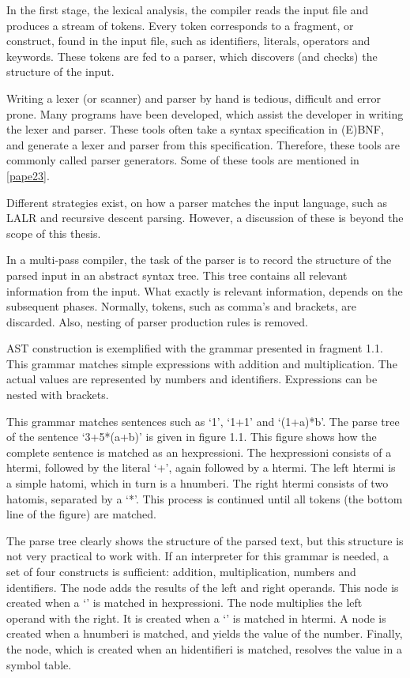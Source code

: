 In the first stage, the lexical analysis, the compiler reads the input file and
produces a stream of tokens. Every token corresponds to a fragment, or
construct, found in the input file, such as identifiers, literals, operators and
keywords. These tokens are fed to a parser, which discovers (and checks) the
structure of the input.

Writing a lexer (or scanner) and parser by hand is tedious, difficult and error
prone. Many programs have been developed, which assist the developer in writing
the lexer and parser. These tools often take a syntax specification in (E)BNF,
and generate a lexer and parser from this specification. Therefore, these tools
are commonly called parser generators. Some of these tools are mentioned in
\ref{pape23}.

Different strategies exist, on how a parser matches the input language, such as
LALR and recursive descent parsing. However, a discussion of these is beyond the
scope of this thesis.


In a multi-pass compiler, the task of the parser is to record the structure of
the parsed input in an abstract syntax tree. This tree contains all relevant
information from the input. What exactly is relevant information, depends on the
subsequent phases. Normally, tokens, such as comma’s and brackets, are
discarded. Also, nesting of parser production rules is removed.

AST construction is exemplified with the grammar presented in fragment 1.1.
This grammar matches simple expressions with addition and multiplication. The
actual values are represented by numbers and identifiers. Expressions can be
nested with brackets.

\bigskip

This grammar matches sentences such as ‘1’, ‘1+1’ and ‘(1+a)*b’. The parse
tree of the sentence ‘3+5*(a+b)’ is given in figure 1.1. This figure shows
how the complete sentence is matched as an hexpressioni. The hexpressioni
consists of a htermi, followed by the literal ‘+’, again followed by a htermi.
The left htermi is a simple hatomi, which in turn is a hnumberi. The right
htermi consists of two hatomis, separated by a ‘*’. This process is continued
until all tokens (the bottom line of the figure) are matched.

The parse tree clearly shows the structure of the parsed text, but this
structure is not very practical to work with. If an interpreter for this grammar
is needed, a set of four constructs is sufficient: addition, multiplication,
numbers and identifiers. The node adds the results of the left and right
operands. This node is created when a ‘’ is matched in hexpressioni. The node
multiplies the left operand with the right. It is created when a ‘’ is matched
in htermi. A node is created when a hnumberi is matched, and yields the value of
the number. Finally, the  node, which is created when an hidentifieri is
matched, resolves the value in a symbol table.




\secup

\label{pape12}

\label{pape13}

\secup